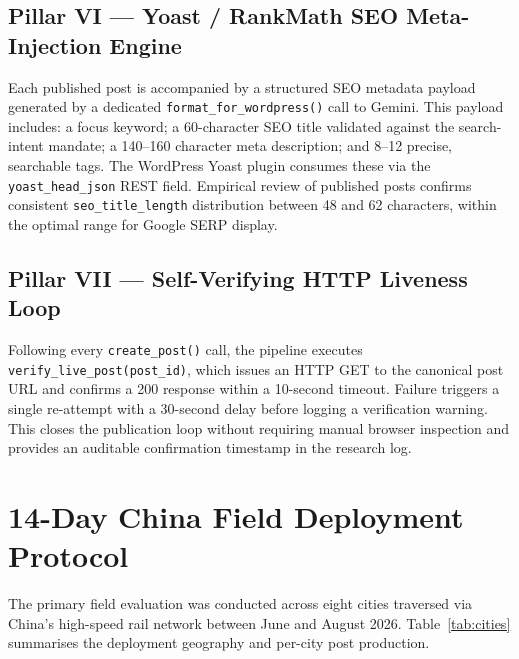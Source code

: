 \documentclass[conference]{IEEEtran}
\begin{document}
\subsection{Pillar VI — Yoast / RankMath SEO Meta-Injection Engine}

Each published post is accompanied by a structured SEO metadata payload
generated by a dedicated \texttt{format\_for\_wordpress()} call to Gemini.
This payload includes: a focus keyword; a 60-character SEO title validated
against the search-intent mandate; a 140--160 character meta description;
and 8--12 precise, searchable tags. The WordPress Yoast plugin consumes
these via the \texttt{yoast\_head\_json} REST field. Empirical review of
published posts confirms consistent \texttt{seo\_title\_length} distribution
between 48 and 62 characters, within the optimal range for Google SERP display.

\subsection{Pillar VII — Self-Verifying HTTP Liveness Loop}

Following every \texttt{create\_post()} call, the pipeline executes
\texttt{verify\_live\_post(post\_id)}, which issues an HTTP GET to the
canonical post URL and confirms a 200 response within a 10-second timeout.
Failure triggers a single re-attempt with a 30-second delay before logging
a verification warning. This closes the publication loop without requiring
manual browser inspection and provides an auditable confirmation timestamp
in the research log.

\section{14-Day China Field Deployment Protocol}
\label{sec:protocol}

The primary field evaluation was conducted across eight cities traversed via
China's high-speed rail network between June and August 2026. Table~\ref{tab:cities}
summarises the deployment geography and per-city post production.
\end{document}
